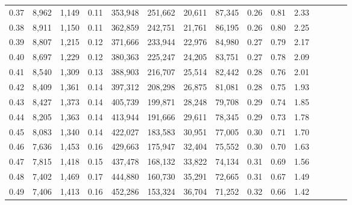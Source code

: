 \begin{tabular}{rrrcrrrrrrrrrrr}
0.37 &   8,962 &   1,149 &                                       0.11 &  353,948 &  251,662 &   20,611 &   87,345 &  0.26 &  0.81 &                         2.33 \\
0.38 &   8,911 &   1,150 &                                       0.11 &  362,859 &  242,751 &   21,761 &   86,195 &  0.26 &  0.80 &                         2.25 \\
0.39 &   8,807 &   1,215 &                                       0.12 &  371,666 &  233,944 &   22,976 &   84,980 &  0.27 &  0.79 &                         2.17 \\
0.40 &   8,697 &   1,229 &                                       0.12 &  380,363 &  225,247 &   24,205 &   83,751 &  0.27 &  0.78 &                         2.09 \\
0.41 &   8,540 &   1,309 &                                       0.13 &  388,903 &  216,707 &   25,514 &   82,442 &  0.28 &  0.76 &                         2.01 \\
0.42 &   8,409 &   1,361 &                                       0.14 &  397,312 &  208,298 &   26,875 &   81,081 &  0.28 &  0.75 &                         1.93 \\
0.43 &   8,427 &   1,373 &                                       0.14 &  405,739 &  199,871 &   28,248 &   79,708 &  0.29 &  0.74 &                         1.85 \\
0.44 &   8,205 &   1,363 &                                       0.14 &  413,944 &  191,666 &   29,611 &   78,345 &  0.29 &  0.73 &                         1.78 \\
0.45 &   8,083 &   1,340 &                                       0.14 &  422,027 &  183,583 &   30,951 &   77,005 &  0.30 &  0.71 &                         1.70 \\
0.46 &   7,636 &   1,453 &                                       0.16 &  429,663 &  175,947 &   32,404 &   75,552 &  0.30 &  0.70 &                         1.63 \\
0.47 &   7,815 &   1,418 &                                       0.15 &  437,478 &  168,132 &   33,822 &   74,134 &  0.31 &  0.69 &                         1.56 \\
0.48 &   7,402 &   1,469 &                                       0.17 &  444,880 &  160,730 &   35,291 &   72,665 &  0.31 &  0.67 &                         1.49 \\
0.49 &   7,406 &   1,413 &                                       0.16 &  452,286 &  153,324 &   36,704 &   71,252 &  0.32 &  0.66 &                         1.42 \\

\end{tabular}

